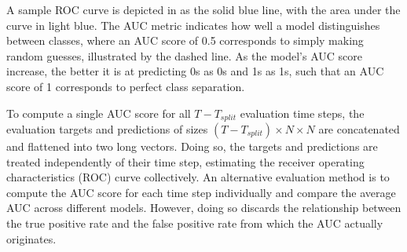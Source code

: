 A sample ROC curve is depicted in  as the solid blue line, with the area under the curve in light blue.
The AUC metric indicates how well a model distinguishes between classes, where an AUC score of 0.5 corresponds to simply making random guesses, illustrated by the dashed line. As the model's AUC score increase, the better it is at predicting 0s as 0s and 1s as 1s, such that an AUC score of 1 corresponds to perfect class separation.

To compute a single AUC score for all $T-T_{split}$ evaluation time steps, the evaluation targets and predictions of sizes $(T-T_{split})\times N\times N$ are concatenated and flattened into two long vectors. Doing so, the targets and predictions are treated independently of their time step, estimating the receiver operating characteristics (ROC) curve collectively.
An alternative evaluation method is to compute the AUC score for each time step individually and compare the average AUC across different models. However, doing so discards the relationship between the true positive rate and the false positive rate from which the AUC actually originates.